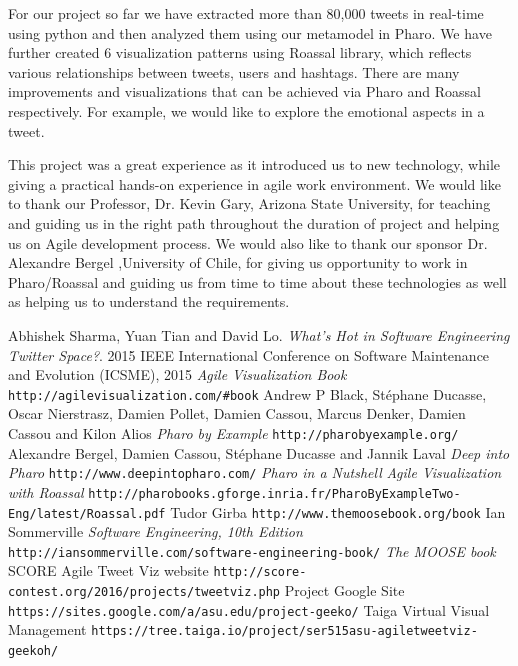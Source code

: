 \documentclass[11pt]{article}
\begin{document}
For our project so far we have extracted more than 80,000 tweets in real-time using python and then analyzed them using our metamodel in Pharo. We have further created 6 visualization patterns using Roassal library, which reflects various relationships between tweets, users and hashtags. There are many improvements and visualizations that can be achieved via Pharo and Roassal respectively. For example, we would like to explore the emotional aspects in a tweet.

This project was a great experience as it introduced us to new technology, while giving a practical hands-on experience in agile work environment. We would like to thank our Professor, Dr. Kevin Gary, Arizona State University, for teaching and guiding us in the right path throughout the duration of project and helping us on Agile development process. We would also like to thank our sponsor Dr. Alexandre Bergel ,University of Chile, for giving us opportunity to work in Pharo/Roassal and guiding us from time to time about these technologies as well as helping us to understand the requirements.
\newpage
\begin{thebibliography}{7}
Abhishek Sharma, Yuan Tian and David Lo.
\textit{What's Hot in Software Engineering Twitter Space?}.
2015 IEEE International Conference on Software Maintenance and Evolution (ICSME), 2015
\textit{Agile Visualization Book}
\texttt{http://agilevisualization.com/\#book}
Andrew P Black, Stéphane Ducasse, Oscar Nierstrasz, Damien Pollet, Damien Cassou, Marcus Denker, Damien Cassou and Kilon Alios
\textit{Pharo by Example}
\texttt{http://pharobyexample.org/}
Alexandre Bergel, Damien Cassou, Stéphane Ducasse and Jannik Laval
\textit{Deep into Pharo}
\texttt{http://www.deepintopharo.com/}
\textit{Pharo in a Nutshell}
\textit{Agile Visualization with Roassal}
\texttt{http://pharobooks.gforge.inria.fr/PharoByExampleTwo-Eng/latest/Roassal.pdf}
Tudor Girba
\texttt{http://www.themoosebook.org/book}
Ian Sommerville
\textit{Software Engineering, 10th Edition}
\texttt{http://iansommerville.com/software-engineering-book/}
\textit{The MOOSE book}
SCORE Agile Tweet Viz website
\texttt{http://score-contest.org/2016/projects/tweetviz.php}
Project Google Site
\texttt{https://sites.google.com/a/asu.edu/project-geeko/}
Taiga Virtual Visual Management
\texttt{https://tree.taiga.io/project/ser515asu-agiletweetviz-geekoh/}
\end{thebibliography}
\end{document}
